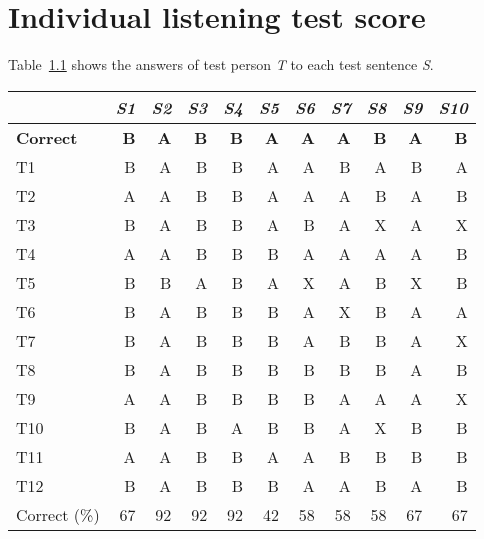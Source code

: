 \chapter{Individual listening test score} %
\label{cha:individual_listening_test_score}

Table~\ref{tab:listening_test_score} shows the answers of test person \emph{T} to each test sentence \emph{S}.
\begin{table}[htbp]
	\begin{center}
		\label{tab:listening_test_score}
		\begin{tabular}{lrrrrrrrrrr}
			\toprule
			 & \multicolumn{1}{c}{\emph{S1}} & \multicolumn{1}{c}{\emph{S2}} & \multicolumn{1}{c}{\emph{S3}} & \multicolumn{1}{c}{\emph{S4}} & \multicolumn{1}{c}{\emph{S5}} & \multicolumn{1}{c}{\emph{S6}} & \multicolumn{1}{c}{\emph{S7}} & \multicolumn{1}{c}{\emph{S8}} & \multicolumn{1}{c}{\emph{S9}} & \multicolumn{1}{c}{\emph{S10}}\\
			\midrule
			\textbf{Correct} & \textbf{B} & \textbf{A} & \textbf{B} & \textbf{B} & \textbf{A} & \textbf{A} & \textbf{A} & \textbf{B} & \textbf{A} & \textbf{B} \\
			T1 & B & A & B & B & A & A & B & A & B & A \\
			T2 & A & A & B & B & A & A & A & B & A & B \\
			T3 & B & A & B & B & A & B & A & X & A & X \\
			T4 & A & A & B & B & B & A & A & A & A & B \\
			T5 & B & B & A & B & A & X & A & B & X & B \\
			T6 & B & A & B & B & B & A & X & B & A & A \\
			T7 & B & A & B & B & B & A & B & B & A & X \\
			T8 & B & A & B & B & B & B & B & B & A & B \\
			T9 & A & A & B & B & B & B & A & A & A & X \\
			T10 & B & A & B & A & B & B & A & X & B & B \\
			T11 & A & A & B & B & A & A & B & B & B & B \\
			T12 & B & A & B & B & B & A & A & B & A & B \\
			\midrule
			Correct (\%) & 67 & 92 & 92 & 92 & 42 & 58 & 58 & 58 & 67 & 67 \\
			\bottomrule			
		\end{tabular}		
	\end{center}	
\end{table}


